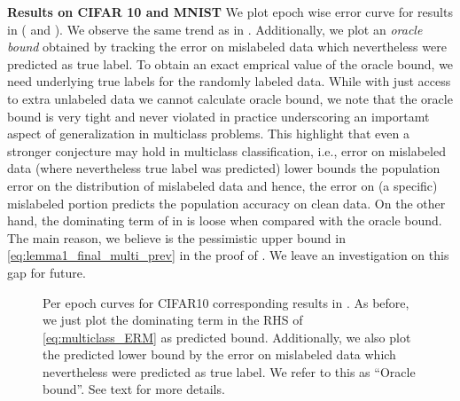 \textbf{Results on CIFAR 10 and MNIST {} {}} 
% 
We plot epoch wise error curve for results in ( and ). We observe the same trend as in . Additionally, we plot an \emph{oracle bound} obtained by tracking the error on mislabeled data which nevertheless were predicted as true label. To obtain an exact emprical value of the oracle bound, we need underlying true labels for the randomly labeled data. 
While with just access to extra unlabeled data we cannot calculate oracle bound, we note that the oracle bound is very tight and never violated in practice underscoring an importamt aspect of generalization in multiclass problems. This highlight that even a stronger conjecture may hold in multiclass classification, i.e., error on mislabeled data (where nevertheless true label was predicted) lower bounds the population error on the distribution of mislabeled data and hence, the error on (a specific) mislabeled portion predicts the population accuracy on clean data. 
% 
On the other hand, the dominating term of in  is loose when compared with the oracle bound. The main reason, we believe is the pessimistic upper bound in \eqref{eq:lemma1_final_multi_prev} in the proof of . We leave an investigation on this gap for future. 




\begin{figure}[h]
    \centering 
     \hfil
    \caption{ Per epoch curves for CIFAR10 corresponding results in . As before, we just plot the dominating term in the RHS of \eqref{eq:multiclass_ERM} as predicted bound. Additionally, we also plot the predicted lower bound by the error on mislabeled data which nevertheless were predicted as true label. We refer to this as ``Oracle bound''. See text for more details. 
    }\label{fig:error_epoch_CIFAR10}
\end{figure}


